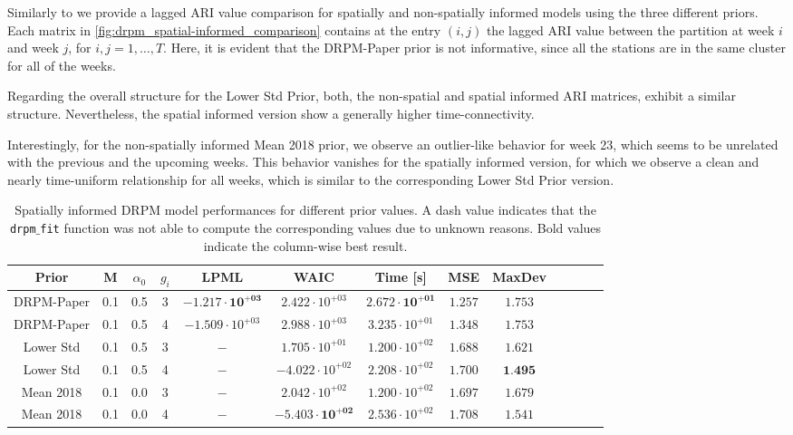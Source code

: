 \documentclass[12pt,a4paper]{article}
\begin{document}
Similarly to \cite{Page2022-SpatioTemporal} we provide a
lagged ARI value comparison for spatially
and non-spatially informed models using the three
different priors. Each matrix in 
\cref{fig:drpm_spatial-informed_comparison}
contains at the entry 
$(i,j)$ the lagged ARI value between the partition at week
$i$ and week $j$, for $i, j= 1, \ldots, T$. Here, it is evident
that the DRPM-Paper prior is not informative, 
since all the stations are in the same cluster for all of
the weeks.

Regarding the overall structure for the Lower Std Prior, both,
the non-spatial and spatial informed ARI matrices, exhibit a similar
structure. Nevertheless, the spatial informed version show
a generally higher time-connectivity.

Interestingly, for the non-spatially informed Mean 2018 prior, we
observe an outlier-like behavior for week 23, which seems to be
unrelated with the previous and the upcoming weeks. This behavior
vanishes for the spatially informed version, for which
we observe
a clean and nearly time-uniform relationship for all weeks, which is
similar to the corresponding Lower Std Prior version.


\begin{table}
    \centering
    \begin{tabular}{ccccccccccccc}
    \toprule
    Prior & M & $\alpha_0$ & $g_i$ & LPML & WAIC & Time [s] & MSE & MaxDev \\
    \midrule
    DRPM-Paper & 0.1 & 0.5 & 3 & $\mathbf{-1.217 \cdot 10^{+03}}$ & $2.422 \cdot 10^{+03}$ & $\mathbf{2.672 \cdot 10^{+01}}$ & $\mathbf{1.257} $ & $1.753$ \\
    DRPM-Paper & 0.1 & 0.5 & 4 & $-1.509 \cdot 10^{+03}$ & $2.988 \cdot 10^{+03}$ & $3.235 \cdot 10^{+01}$ & $1.348 $ & $1.753$ \\
    Lower Std &  0.1 & 0.5 & 3 & $-$ & $1.705 \cdot 10^{+01}$ & $1.200 \cdot 10^{+02}$ & $1.688 $ & $1.621 $ \\
    Lower Std &  0.1 & 0.5 & 4 & $-$ & $-4.022 \cdot 10^{+02}$ & $2.208 \cdot 10^{+02}$ & $1.700 $ & $\textbf{1.495} $ \\
    Mean 2018 &  0.1 & 0.0 & 3 & $-$ & $2.042 \cdot 10^{+02}$ & $1.200 \cdot 10^{+02}$ & $1.697 $ & $1.679 $ \\
    Mean 2018 &  0.1 & 0.0 & 4 & $-$ & $\mathbf{-5.403 \cdot 10^{+02}}$ & $2.536 \cdot 10^{+02}$ & $1.708 $ & $1.541 $ \\
    \bottomrule
    \end{tabular}
\caption{Spatially informed DRPM model performances for different prior values. A dash value indicates that the \texttt{drpm$\_$fit} function
was not able to compute the corresponding values due to unknown reasons. Bold values indicate the column-wise best result.}
\label{tab:DRPMSpatialBaselineSummary}
\end{table}
\end{document}
